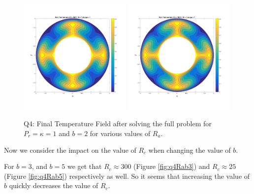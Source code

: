 \documentclass{article}
\begin{document}
\begin{figure}[h!]
		\includegraphics[width = 0.49\textwidth]{fig_q4ra5000}
		\includegraphics[width = 0.49\textwidth]{fig_q4ra10000}
		\caption{Q4: Final Temperature Field after solving the full problem for $P_r = \kappa = 1$ and $b=2$ for various values of $R_a$.}
		\label{fig:q4Rab2}
	\end{figure}

Now we consider the impact on the value of $R_c$ when changing the value of $b$. 

For $b=3$, and $b=5$ we get that $R_c \approx 300 $ (Figure \ref{fig:q4Rab3}) and $R_c \approx 25$ (Figure \ref{fig:q4Rab5}) respectively as well. So it seems that increasing the value of $b$ quickly decreases the value of $R_c$.  
\end{document}

